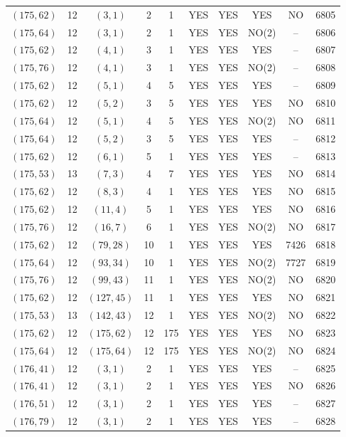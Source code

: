\begin{longtable}{|c|c|c|c|c|c|c|c|c|c|}
$(175, 62)$ & 12 & $(3, 1)$ & 2 & 1 & YES & YES & YES & NO & 6805\\
$(175, 64)$ & 12 & $(3, 1)$ & 2 & 1 & YES & YES & NO(2) & -- & 6806\\
$(175, 62)$ & 12 & $(4, 1)$ & 3 & 1 & YES & YES & YES & -- & 6807\\
$(175, 76)$ & 12 & $(4, 1)$ & 3 & 1 & YES & YES & NO(2) & -- & 6808\\
$(175, 62)$ & 12 & $(5, 1)$ & 4 & 5 & YES & YES & YES & -- & 6809\\
$(175, 62)$ & 12 & $(5, 2)$ & 3 & 5 & YES & YES & YES & NO & 6810\\
$(175, 64)$ & 12 & $(5, 1)$ & 4 & 5 & YES & YES & NO(2) & NO & 6811\\
$(175, 64)$ & 12 & $(5, 2)$ & 3 & 5 & YES & YES & YES & -- & 6812\\
$(175, 62)$ & 12 & $(6, 1)$ & 5 & 1 & YES & YES & YES & -- & 6813\\
$(175, 53)$ & 13 & $(7, 3)$ & 4 & 7 & YES & YES & YES & NO & 6814\\
$(175, 62)$ & 12 & $(8, 3)$ & 4 & 1 & YES & YES & YES & NO & 6815\\
$(175, 62)$ & 12 & $(11, 4)$ & 5 & 1 & YES & YES & YES & NO & 6816\\
$(175, 76)$ & 12 & $(16, 7)$ & 6 & 1 & YES & YES & NO(2) & NO & 6817\\
$(175, 62)$ & 12 & $(79, 28)$ & 10 & 1 & YES & YES & YES & 7426 & 6818\\
$(175, 64)$ & 12 & $(93, 34)$ & 10 & 1 & YES & YES & NO(2) & 7727 & 6819\\
$(175, 76)$ & 12 & $(99, 43)$ & 11 & 1 & YES & YES & NO(2) & NO & 6820\\
$(175, 62)$ & 12 & $(127, 45)$ & 11 & 1 & YES & YES & YES & NO & 6821\\
$(175, 53)$ & 13 & $(142, 43)$ & 12 & 1 & YES & YES & NO(2) & NO & 6822\\
$(175, 62)$ & 12 & $(175, 62)$ & 12 & 175 & YES & YES & YES & NO & 6823\\
$(175, 64)$ & 12 & $(175, 64)$ & 12 & 175 & YES & YES & NO(2) & NO & 6824\\
$(176, 41)$ & 12 & $(3, 1)$ & 2 & 1 & YES & YES & YES & -- & 6825\\
$(176, 41)$ & 12 & $(3, 1)$ & 2 & 1 & YES & YES & YES & NO & 6826\\
$(176, 51)$ & 12 & $(3, 1)$ & 2 & 1 & YES & YES & YES & -- & 6827\\
$(176, 79)$ & 12 & $(3, 1)$ & 2 & 1 & YES & YES & YES & -- & 6828\\

\end{longtable}
